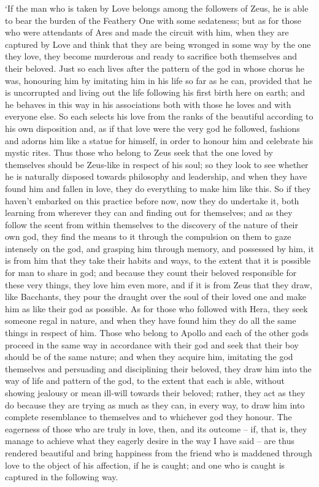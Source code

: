‘If the man who is taken by Love belongs among the followers of Zeus, he
is able to bear the burden of the Feathery One with some sedateness; but
as for those who were attendants of
Ares  and made
the circuit with him, when they are captured by Love and think that they
are being wronged in some way by the one they love, they become
murderous and ready to sacrifice both themselves and their beloved. Just
so each lives after the pattern  of the god in whose chorus he
was, honouring him by imitating him in his life so far as he can,
provided that he is uncorrupted and living out the life following his
first birth here on earth; and he behaves in this way in his
associations both with those he loves and with everyone else. So each
selects his love from  the ranks of the beautiful according to
his own disposition and, as if that love were the very god he followed,
fashions and adorns him like a statue for himself, in order to honour
him  and celebrate his mystic rites. Thus those who belong to
Zeus seek that the one loved by themselves should be Zeus-like in
respect of his soul; so they look to see whether he is naturally
disposed towards philosophy and leadership, and when they have found him
and fallen in love, they do everything to make  him like this.
So if they haven't embarked on this
practice before now, now
they do undertake it, both learning from wherever they can and finding
out for themselves; and as they follow the  scent from within
themselves to the discovery of the nature of their own god, they find
the means to it through the compulsion on them to gaze intensely on the
god, and grasping him through memory, and possessed by him, it is from
him that they take their habits and ways, to the extent that it is
possible for man  to share in god; and because they count their
beloved responsible for these very things, they love him even more, and
if it is from Zeus that they draw, like Bacchants, they pour the draught
 over the soul of their loved one and make him as like their god
as possible. As for those who followed with Hera, they seek someone
regal in nature, and when they have found him they do all the same
things in respect of him. Those who belong to Apollo and each of the
other gods proceed in the same way in accordance with their god and seek
that their boy should be of  the same nature; and when they
acquire him, imitating the god themselves and persuading and
disciplining their beloved, they draw him into the way of life and
pattern of the god, to the extent that each is able, without showing
jealousy or mean  ill-will towards their beloved; rather, they
act as they do because they are trying as much as they can, in every
way, to draw him into complete resemblance to themselves and to
whichever god they honour. The eagerness of those who are truly in love,
then, and its outcome --
if, that is, they manage to achieve what they eagerly desire in the way
I have said -- are thus rendered  beautiful and bring happiness
from the friend who is maddened through love to the object of his
affection, if he is caught; and one who is caught is captured in the
following way.

